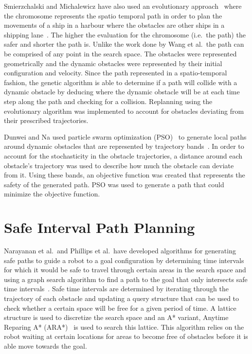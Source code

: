 Smierzchalski and Michalewicz have also used an evolutionary
approach~\cite{evosurvey} where the chromosome represents the spatio temporal
path in order to plan the movements of a ship in a harbour where the obstacles
are other ships in a shipping lane~\cite{smierzchalski2005path}.  The higher
the evaluation for the chromosome (i.e.\ the path) the safer and shorter the
path is. Unlike the work done by Wang et al.\, the path can be comprised of any
point in the search space.  The obstacles were represented geometrically and
the dynamic obstacles were represented by their initial configuration and
velocity.  Since the path represented in a spatio-temporal fashion, the genetic
algorithm is able to determine if a path will collide with a dynamic obstacle
by deducing where the dynamic obstacle will be at each time step along the path
and checking for a collision.  Replanning using the evolutionary algorithm was
implemented to account for obstacles deviating from their prescribed
trajectories.

Dunwei and Na used particle swarm optimization (PSO)~\cite{kennedy2010particle}
to generate local paths around dynamic obstacles that are represented by
trajectory bands~\cite{dunwei2011local}.  In order to account for the
stochasticity in the obstacle trajectories, a distance around each obstacle's
trajectory was used to describe how much the obstacle can deviate from it.
Using these bands, an objective function was created that represents the safety
of the generated path. PSO was used to generate a path that could minimize the
objective function.

\section{Safe Interval Path Planning}

Narayanan et al.\ and Phillips et al.\ have developed algorithms for generating
safe paths to guide a robot to a goal configuration by determining time
intervals for which it would be safe to travel through certain areas in the
search space and using a graph search algorithm to find a path to the goal that
only intersects safe time intervals~\cite{asipp, sipp}.  Safe time intervals
are determined by iterating through the trajectory of each obstacle and
updating a query structure that can be used to check whether a certain space
will be free for a given period of time. A lattice structure is used to
discretize the search space and an A* variant, Anytime Reparing A*
(ARA*)~\cite{likhachev2003ara} is used to search this lattice. This algorithm
relies on the robot waiting at certain locations for areas to become free of
obstacles before it is able move towards the goal.

